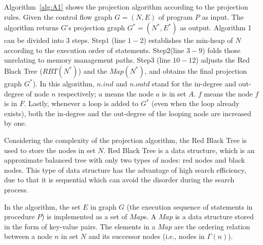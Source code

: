 Algorithm~\ref{alg:A1} shows the projection algorithm according to the projection rules. %
%
Given the control flow graph $G = (N, E)$ of program $P$ as input. The algorithm returns $G$'s projection graph $G^*= (N^*, E^*)$ as output. Algorithm 1 can be divided into $3$ steps. Step$1$ (line $1-2$) establishes the min-heap of $N$ according to the execution order of statements. Step$2$(line $3-9$) folds those unrelating to memory management paths. Step$3$ (line $10-12$) adjusts the Red Black Tree ($\mathit{RBT}(N^*)$) and the $\mathit{Map}(N^*)$, and obtains the final projection graph $G^*$).
In this algorithm, $n.ind$ and $n.outd$ stand for the in-degree and out-degree of node $n$ respectively; $a$ means the node $a$ is in set $A$. $f$ means the node $f$ is in $F$. Lastly, whenever a loop is added to $G^*$ (even when the loop already exists), both the in-degree and the out-degree of the looping node are increased by one.

Considering the complexity of the projection algorithm, the Red Black Tree is used to store the nodes in set $N$. Red Black Tree is a data structure, which is an approximate balanced tree with only two types of nodes: red nodes and black nodes. This type of data structure has the advantage of high search efficiency, due to that it is sequential which can avoid the disorder during the search process. 

In the algorithm, the set $E$ in graph $G$ (the execution sequence of statements in procedure $P$) is implemented as a set of $Map$s. A $Map$ is a data structure stored in the form of key-value pairs. The elements in a $Map$ are the ordering relation between a node $n$ in set $N$ and its successor nodes (i.e., nodes in $\Gamma(n)$).

